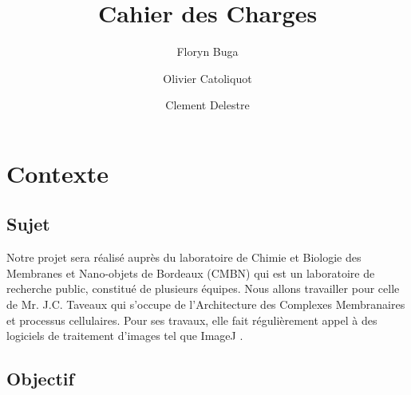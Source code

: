 \documentclass[11pt]{report}
\begin{document}





\author{Floryn Buga\and Olivier Catoliquot\and Clement Delestre}
\title{Cahier des Charges}

\maketitle %
\tableofcontents %
\newpage
\chapter{Contexte}
\section{Sujet}
Notre projet sera réalisé auprès du laboratoire de Chimie et Biologie des Membranes et Nano-objets de Bordeaux (CMBN)  qui est un laboratoire de recherche public, constitué de plusieurs équipes. Nous allons travailler pour celle de Mr. J.C. Taveaux qui s'occupe de l'Architecture des Complexes Membranaires et processus cellulaires. Pour ses travaux, elle fait régulièrement appel à des logiciels de traitement d'images tel que ImageJ \cite{imagej}.


\section{Objectif}
\end{document}

